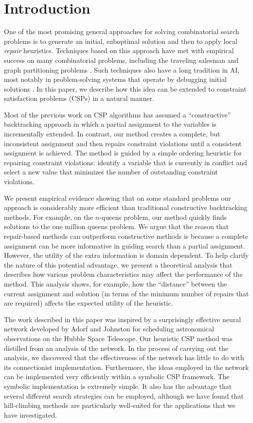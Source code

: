 \section{Introduction}
\label{Introduction}

  One of the most promising general approaches for solving combinatorial search
problems is to generate an initial, suboptimal solution and then to apply
local {\em repair} 
heuristics.
Techniques based on
this approach have met with empirical success on many combinatorial 
problems, including
the traveling salesman and graph partitioning problems \cite{papad}.  
Such techniques also have a long tradition in AI, most notably in
problem-solving systems that operate by debugging initial
solutions \cite{simmons-aaai88,hacker}.
In this paper, we describe how this idea can be extended to
constraint satisfaction problems (CSPs) in a natural manner.

Most of the previous work on CSP algorithms has assumed a
``constructive'' backtracking approach in which a partial assignment
to the variables is incrementally extended. In contrast, our 
method \cite{min-aaai} creates a complete, but inconsistent assignment and
then repairs constraint violations until a consistent assignment is
achieved.  The method is guided by a simple ordering heuristic for
repairing constraint violations: identify a variable that is currently
in conflict and select a new value that minimizes the number of
outstanding constraint violations.


We present empirical evidence showing that on some standard problems
our approach is considerably more efficient than traditional constructive
backtracking methods. For example, on the $n$-queens problem, our
method quickly finds solutions to the one million queens 
problem.
We argue that the reason that repair-based methods can outperform
constructive methods is because a complete assignment can be more
informative in guiding search than a partial assignment.
However, the utility of
the extra information is domain dependent. To help clarify the nature of
this potential advantage, we present a theoretical analysis that
describes how various problem characteristics may affect the
performance of the method. This analysis shows, for example, how the
``distance'' between the current assignment and solution (in terms of
the minimum number of repairs that are required) affects the expected
utility of the heuristic.

The work described in this paper was inspired by a surprisingly
effective neural network developed by Adorf and 
Johnston \cite{adorf,johnston}
 for scheduling astronomical observations on the
Hubble Space Telescope.  Our heuristic CSP method
was distilled from
an analysis of the network.
In the process of carrying out the
analysis, we discovered that the effectiveness of the network has
little to do with its connectionist implementation. Furthermore, the
ideas employed in the network can be implemented very efficiently
within a symbolic CSP framework. The symbolic implementation is
extremely simple. It also has the advantage that several different
search strategies can be employed, although we have found that
hill-climbing methods are particularly well-suited for the
applications that we have investigated.

